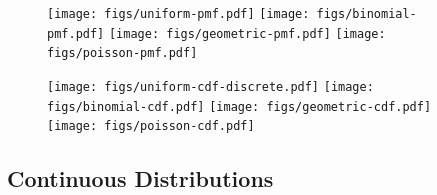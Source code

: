 \documentclass[landscape]{article}
\begin{document}

\pagebreak

\begin{figure}[H]
  \texttt{[image: figs/uniform-pmf.pdf]}
  \texttt{[image: figs/binomial-pmf.pdf]}
  \texttt{[image: figs/geometric-pmf.pdf]}
  \texttt{[image: figs/poisson-pmf.pdf]}

  \texttt{[image: figs/uniform-cdf-discrete.pdf]}
  \texttt{[image: figs/binomial-cdf.pdf]}
  \texttt{[image: figs/geometric-cdf.pdf]}
  \texttt{[image: figs/poisson-cdf.pdf]}
\end{figure}

\subsection{Continuous Distributions}
\end{document}
